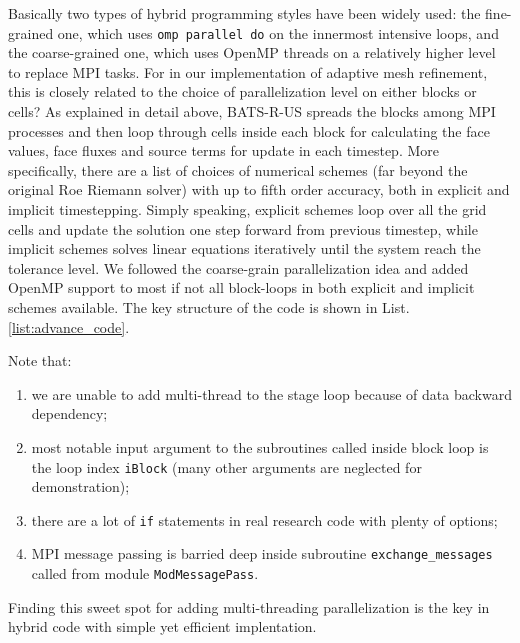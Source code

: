 \documentclass[fleqn,11pt]{SelfArx} %
\begin{document}
Basically two types of hybrid programming styles have been widely used: the fine-grained one, which uses \verb|omp parallel do| on the innermost intensive loops, and the coarse-grained one, which uses OpenMP threads on a relatively higher level to replace MPI tasks. For in our implementation of adaptive mesh refinement, this is closely related to the choice of parallelization level on either blocks or cells? As explained in detail above, BATS-R-US spreads the blocks among MPI processes and then loop through cells inside each block for calculating the face values, face fluxes and  source terms for update in each timestep. More specifically, there are a list of choices of numerical schemes (far beyond the original Roe Riemann solver) with up to fifth order accuracy, both in explicit and implicit timestepping. Simply speaking, explicit schemes loop over all the grid cells and update the solution one step forward from previous timestep, while implicit schemes solves linear equations iteratively until the system reach the tolerance level. We followed the coarse-grain parallelization idea and added OpenMP support to most if not all block-loops in both explicit and implicit  schemes available. The key structure of the code is shown in List.\ref{list:advance_code}. 

Note that:
\begin{enumerate}[noitemsep]
\item we are unable to add multi-thread to the stage loop because of data backward dependency;
\item most notable input argument to the subroutines called inside block loop is the loop index \verb|iBlock| (many other  arguments are neglected for demonstration);
\item there are a lot of \verb|if| statements in real research code with plenty of options;
\item MPI message passing is barried deep inside subroutine \verb|exchange_messages| called from module \verb|ModMessagePass|.
\end{enumerate}

Finding this sweet spot for adding multi-threading parallelization is the key in hybrid code with simple yet efficient implentation. 
\end{document}
